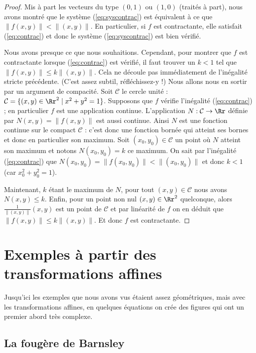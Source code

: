 \documentclass[11pt,class=report,crop=false]{standalone}
\begin{document}
\begin{proof}
Mis à part les vecteurs du type $(0,1)$ ou $(1,0)$ (traités à part), nous avons montré que
le système (\ref{eq:syscontrac}) est équivalent à ce que $\|f(x,y)\| < \|(x,y) \|$.
En particulier, si $f$ est contractante, elle satisfait (\ref{eq:contrac}) et donc le système (\ref{eq:syscontrac}) est bien vérifié.


\bigskip 

Nous avons presque ce que nous souhaitions. Cependant, pour montrer que $f$ est contractante lorsque (\ref{eq:contrac}) est vérifié, il faut trouver un $k<1$
tel que $\|f(x,y)\| \le k\|(x,y) \|$. Cela ne découle pas immédiatement de l'inégalité stricte précédente.
(C'est assez subtil, réfléchissez-y !)
Nous allons nous en sortir par un argument de compacité. 
Soit $\mathcal{C}$ le cercle unité : $\mathcal{C} = \{ (x,y)\in \Rr^2 \mid x^2+y^2=1 \}$.
Supposons que $f$ vérifie l'inégalité
(\ref{eq:contrac}) ; en particulier $f$ est une application continue.
L'application $N :\mathcal{C} \to \Rr$ définie par 
$N(x,y) = {\|f(x,y)\|}$ est aussi continue. Ainsi $N$ est une fonction continue sur le compact $\mathcal{C}$ :
c'est donc une fonction bornée qui atteint ses bornes et donc en particulier son maximum.
Soit $(x_0,y_0) \in \mathcal{C}$ un point où $N$ atteint son maximum et notons
$N(x_0,y_0)=k$ ce maximum. On sait par l'inégalité (\ref{eq:contrac}) que
$N(x_0,y_0)=\|f(x_0,y_0)\| < \|(x_0,y_0)\|$ et donc $k< 1$ (car $x_0^2+y_0^2=1$).

Maintenant, $k$ étant le maximum de $N$, pour tout $(x,y) \in \mathcal{C}$ nous avons
$N(x,y) \le k$.
Enfin, pour un point non nul $(x,y)\in\Rr^2$ quelconque, alors
$\frac{1}{\|(x,y)\|}(x,y)$ est un point de $\mathcal{C}$ et par linéarité de $f$ on en déduit que
$\|f(x,y)\| \le k\|(x,y) \|$. Et donc $f$ est contractante.
\end{proof}

\section{Exemples à partir des transformations affines}

Jusqu'ici les exemples que nous avons vus étaient assez géométriques, mais
avec les transformations affines, en quelques équations on crée des figures
qui ont un premier abord très complexe.

\subsection{La fougère de Barnsley}
\end{document}
